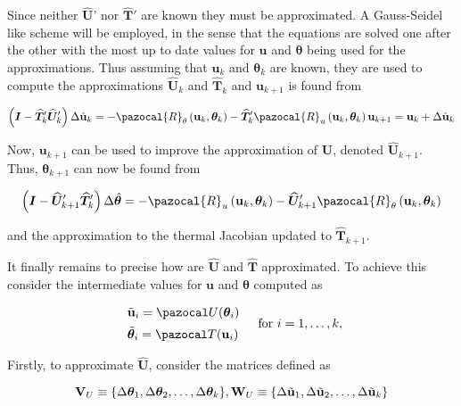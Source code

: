 Since neither $\hat{\mathbf U}’$ nor $\hat{\mathbf T}'$ are known they must be approximated. A Gauss-Seidel like scheme will be employed, in the sense that the equations are solved one after the other with the most up to date values for $\mathbf u$ and $\boldsymbol \theta$ being used for the approximations. Thus assuming that $\mathbf u_k$ and $\boldsymbol \theta_k$ are known, they are used to compute the approximations $\hat{\mathbf U}_k$ and $\hat{\mathbf T}_k$ and $\mathbf u_{k+1}$ is found from

$$
\left(\boldsymbol{I}-\widehat{\boldsymbol{T}}_{k}^{\prime} \widehat{\boldsymbol{U}}_{k}^{\prime}\right) \Delta \hat{\mathbf{u}}_k=-\pazocal{R}_{\theta}\left(\mathbf{u}_{k}, \boldsymbol{\theta}_{k}\right)-\widehat{\boldsymbol{T}}_{k}^{\prime} \pazocal{R}_{u}\left(\mathbf{u}_{k}, \boldsymbol{\theta}_{k}\right)\\ \mathbf{u}_{k+1} = \mathbf{u}_k + \Delta \hat{\mathbf{u}}_k
$$

Now, $\mathbf u_{k+1}$ can be used to improve the approximation of $\hat{\mathbf U}$, denoted $\hat{\mathbf U}_{k+1}$. Thus, $\boldsymbol \theta_{k+1}$ can now be found from

$$
\left(\boldsymbol{I}-\widehat{\boldsymbol{U}}_{k+1}^{\prime} \widehat{\boldsymbol{T}}_{k}^{\prime}\right) \Delta \hat{\boldsymbol{\theta}}=-\pazocal{R}_{u}\left(\mathbf{u}_{k}, \boldsymbol{\theta}_{k}\right)-\widehat{\boldsymbol{U}}_{k+1}^{\prime} \pazocal{R}_{\theta}\left(\mathbf{u}_{k}, \boldsymbol{\theta}_{k}\right)
$$

and the approximation to the thermal Jacobian updated to $\hat{\mathbf T}_{k+1}$.

It finally remains to precise how are $\hat{\mathbf U}$ and $\hat{\mathbf T}$ approximated. To achieve this consider the intermediate values for $\mathbf u$ and $\boldsymbol \theta$ computed as

$$
\begin{array}{l}
\tilde{\mathbf u}_i = \pazocal U(\boldsymbol \theta_i)\\[5pt]
\tilde{\boldsymbol \theta}_i = \pazocal T(\mathbf u_i)
\end{array}\quad \text{for }i=1,\dots,k,
$$

Firstly, to approximate $\hat{\mathbf U}$, consider the matrices defined as

$$
\mathbf V_U \equiv \{\Delta \boldsymbol \theta_1, \Delta \boldsymbol \theta_2, \dots, \Delta \boldsymbol \theta_k\},\\
\mathbf W_U \equiv \{\Delta \tilde{\mathbf u}_1, \Delta \tilde{\mathbf u}_2, \dots, \Delta\tilde{\mathbf u}_k\}
$$

